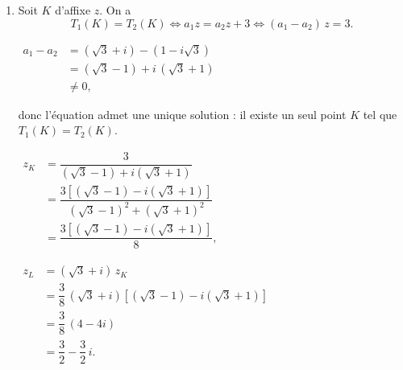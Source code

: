 \documentclass[12pt,a4paper]{article}
\begin{document}
\begin{enumerate}
    L'écriture complexe de $T_2\circ T_1$ est donc $z' = (2\sqrt3 - 2i)\,z + 3$.

    Comme $a_1a_2 \neq 1$, il y a un unique point invariant d'affixe $\omega$ :

    $
    \begin{aligned}
    \omega &= \dfrac{3}{1 - 2\sqrt3 + 2i} \\[1mm]
           &= \dfrac{3\,(1 - 2\sqrt3 - 2i)}{(1 - 2\sqrt3)^2 + 4} \\[1mm]
           &= \dfrac{3\,(1 - 2\sqrt3 - 2i)}{17 - 4\sqrt3}.
    \end{aligned}
    $

    \[
    \boxed{T_2\circ T_1 \text{ est la similitude directe de centre } \Omega\left(\dfrac{3\,(1 - 2\sqrt3 - 2i)}{17 - 4\sqrt3}\right) \text{, de rapport } 4 \text{ et d'angle } -\dfrac{\pi}{6}.}
    \]

    \item Soit $K$ d'affixe $z$. On a
    \[
    T_1(K) = T_2(K)
    \iff a_1 z = a_2 z + 3
    \iff (a_1 - a_2)\,z = 3 .
    \]

    $
    \begin{aligned}
    a_1 - a_2 &= (\sqrt3 + i) - (1 - i\sqrt3) \\[1mm]
              &= (\sqrt3 - 1) + i\,(\sqrt3 + 1) \\[1mm]
              &\neq 0,
    \end{aligned}
    $

    donc l'équation admet une unique solution : il existe un seul point $K$ tel que $T_1(K) = T_2(K)$.

    $
    \begin{aligned}
    z_K &= \dfrac{3}{(\sqrt3 - 1) + i(\sqrt3 + 1)} \\[1mm]
        &= \dfrac{3\left[(\sqrt3 - 1) - i(\sqrt3 + 1)\right]}{(\sqrt3 - 1)^2 + (\sqrt3 + 1)^2} \\[1mm]
        &= \dfrac{3\left[(\sqrt3 - 1) - i(\sqrt3 + 1)\right]}{8},
    \end{aligned}
    $

    $
    \begin{aligned}
    z_L &= (\sqrt3 + i)\,z_K \\[1mm]
        &= \dfrac{3}{8}\,(\sqrt3 + i)\left[(\sqrt3 - 1) - i(\sqrt3 + 1)\right] \\[1mm]
        &= \dfrac{3}{8}\,(4 - 4i) \\[1mm]
        &= \dfrac{3}{2} - \dfrac{3}{2}\,i.
    \end{aligned}
    $


\end{enumerate}
\end{document}
